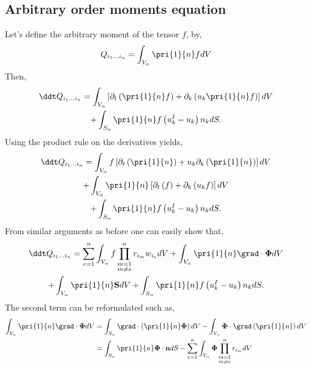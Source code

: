 \subsection*{Arbitrary order moments equation}

Let's define the arbitrary moment of the tensor $f$, by, 
\begin{equation*}
    Q_{i_1\ldots i_n}
    = \int_{V_\alpha} 
    \pri{1}{n} f dV
\end{equation*}
Then,
\begin{multline*}
    \ddt Q_{i_1\ldots i_n}
    =\int_{V_\alpha} \left[ \partial_t \left(\pri{1}{n}f\right) 
    + \partial_k \left(u_k \pri{1}{n}f\right) \right]dV\\
    +\int_{S_\alpha} \pri{1}{n} f \left(u^I_k - u_k\right) n_k dS.
\end{multline*}
Using the product rule on the derivatives yields, 
\begin{multline*}
    \ddt Q_{i_1\ldots i_n}
    =\int_{V_\alpha} f \left[ \partial_t \left(\pri{1}{n}\right) 
    + u_k \partial_k \left( \pri{1}{n}\right) \right]dV\\
    +\int_{V_\alpha} \pri{1}{n} \left[ \partial_t \left(f\right) 
    +  \partial_k \left(u_k f \right) \right]dV\\
    +\int_{S_\alpha} \pri{1}{n} f \left(u^I_k - u_k\right) n_k dS.
\end{multline*}
From similar arguments as before one can easily show that, 
\begin{multline*}
    \ddt Q_{i_1\ldots i_n}
    = \sum_{e=1}^{n} \int_{V_\alpha} f  \prod^{n}_{\substack{ m=1 \\   m \neq e}} r_{i_m} w_{i_e}dV
    +\int_{V_\alpha} \pri{1}{n} \grad\cdot\mathbf{\Phi} dV\\
    + \int_{V_\alpha} \pri{1}{n} \textbf{S} dV
    +\int_{S_\alpha} \pri{1}{n} f \left(u^I_k - u_k\right) n_k dS.
\end{multline*}
The second term can be reformulated such as,
\begin{align*}
    \int_{V_\alpha} \pri{1}{n} \grad\cdot\mathbf{\Phi} dV
    &= \int_{S_\alpha} \grad \cdot \left(\pri{1}{n} \mathbf{\Phi} \right)dV
    - \int_{V_\alpha} \mathbf{\Phi} \cdot \grad \left(\pri{1}{n} \right)dV\\
    &= \int_{S_\alpha} \pri{1}{n} \mathbf{\Phi} \cdot \textbf{n}dS
    -\sum_{e=1}^{n} \int_{V_\alpha} \mathbf{\Phi}  \prod^{n}_{\substack{ m=1 \\m \neq e}} r_{i_m}  dV
\end{align*}
